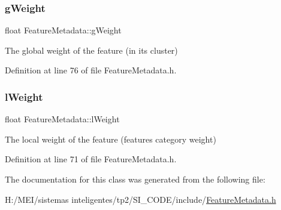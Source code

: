 \subsubsection{\texorpdfstring{g\+Weight}{gWeight}}
{\footnotesize\ttfamily float Feature\+Metadata\+::g\+Weight\hspace{0.3cm}{\ttfamily [protected]}}

The global weight of the feature (in its cluster) 

Definition at line 76 of file Feature\+Metadata.\+h.

\mbox{\label{class_feature_metadata_a5b7a2efcdc98b2fc62fd7e47eceed296}} 
\subsubsection{\texorpdfstring{l\+Weight}{lWeight}}
{\footnotesize\ttfamily float Feature\+Metadata\+::l\+Weight\hspace{0.3cm}{\ttfamily [protected]}}

The local weight of the feature (features\textquotesingle{} category weight) 

Definition at line 71 of file Feature\+Metadata.\+h.



The documentation for this class was generated from the following file\+:\begin{DoxyCompactItemize}
\item 
H\+:/\+M\+E\+I/sistemas inteligentes/tp2/\+S\+I\+\_\+\+C\+O\+D\+E/include/\hyperlink{_feature_metadata_8h}{Feature\+Metadata.\+h}\end{DoxyCompactItemize}
